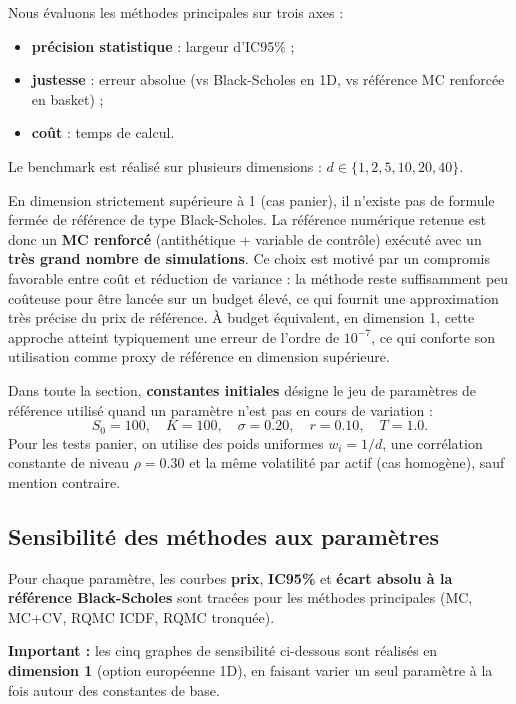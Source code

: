 ﻿\documentclass[11pt,a4paper]{article}
\begin{document}
Nous évaluons les méthodes principales sur trois axes :
\begin{itemize}
    \item \textbf{précision statistique} : largeur d'IC95\% ;
    \item \textbf{justesse} : erreur absolue (vs Black-Scholes en 1D, vs référence MC renforcée en basket) ;
    \item \textbf{coût} : temps de calcul.
\end{itemize}

Le benchmark est réalisé sur plusieurs dimensions : $d\in\{1,2,5,10,20,40\}$.

En dimension strictement supérieure à 1 (cas panier), il n'existe pas de formule fermée de référence de type Black-Scholes. La référence numérique retenue est donc un \textbf{MC renforcé} (antithétique + variable de contrôle) exécuté avec un \textbf{très grand nombre de simulations}. Ce choix est motivé par un compromis favorable entre coût et réduction de variance : la méthode reste suffisamment peu coûteuse pour être lancée sur un budget élevé, ce qui fournit une approximation très précise du prix de référence. À budget équivalent, en dimension 1, cette approche atteint typiquement une erreur de l'ordre de $10^{-7}$, ce qui conforte son utilisation comme proxy de référence en dimension supérieure.

Dans toute la section, \textbf{constantes initiales} désigne le jeu de paramètres de référence utilisé quand un paramètre n'est pas en cours de variation :
\[
S_0=100,\quad K=100,\quad \sigma=0.20,\quad r=0.10,\quad T=1.0.
\]
Pour les tests panier, on utilise des poids uniformes $w_i=1/d$, une corrélation constante de niveau $\rho=0.30$ et la même volatilité par actif (cas homogène), sauf mention contraire.

\subsection{Sensibilité des méthodes aux paramètres}

Pour chaque paramètre, les courbes \textbf{prix}, \textbf{IC95\%} et \textbf{écart absolu à la référence Black-Scholes} sont tracées pour les méthodes principales (MC, MC+CV, RQMC ICDF, RQMC tronquée).

\textbf{Important :} les cinq graphes de sensibilité ci-dessous sont réalisés en \textbf{dimension 1} (option européenne 1D), en faisant varier un seul paramètre à la fois autour des constantes de base.
\end{document}
